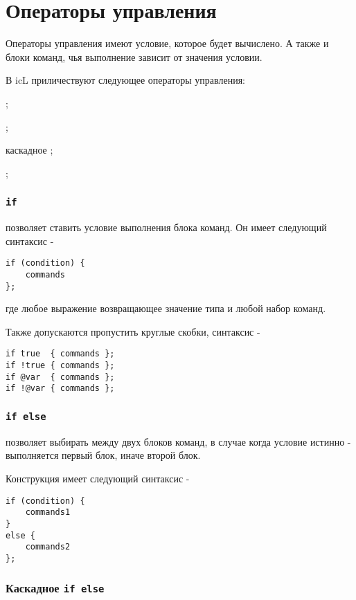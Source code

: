 \section{Операторы управления}

Операторы управления имеют условие, которое будет вычислено. А также и блоки команд, чья выполнение зависит от значения условии.

В icL приличествуют следующее операторы управления:
\begin{icItems}
	\item {};
	\item {};
	\item каскадное ;
	\item {};
\end{icItems}

\subsubsection{\lstinline|if|}

 позволяет ставить условие выполнения блока команд. Он имеет следующий синтаксис -
\begin{lstlisting}[numbers=none]
if (condition) {
	commands
};
\end{lstlisting}
где  любое выражение возвращающее значение типа \bool{} и  любой набор команд.

Также допускаются пропустить круглые скобки, синтаксис -
\begin{lstlisting}[numbers=none]
if true  { commands };
if !true { commands };
if @var  { commands };
if !@var { commands };
\end{lstlisting}

\subsubsection{\lstinline|if else|}

 позволяет выбирать между двух блоков команд, в случае когда условие истинно - выполняется первый блок, иначе второй блок.

Конструкция  имеет следующий синтаксис -
\begin{lstlisting}[numbers=none]
if (condition) {
	commands1
}
else {
	commands2
};
\end{lstlisting}

\subsubsection{Каскадное \lstinline|if else|}

